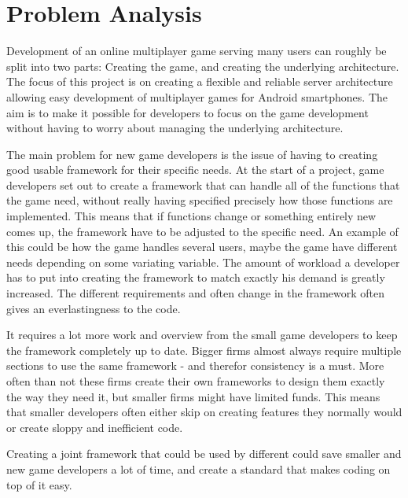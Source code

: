 \chapter{Problem Analysis}


Development of an online multiplayer game serving many users can roughly be split into two parts: Creating the game, and creating the underlying architecture. The focus of this project is on creating a flexible and reliable server architecture  allowing easy development of multiplayer games for Android smartphones. The aim is to make it possible for developers to focus on the game development without having to worry about managing the underlying architecture. 

The main problem for new game developers is the issue of having to creating  good usable framework for their specific needs. At the start of a project, game developers set out to create a framework that can handle all of the functions that the game need, without really having specified precisely how those functions are implemented. This means that if functions change or something entirely new comes up, the framework have to be adjusted to the specific need. An example of this could be how the game handles several users, maybe the game have different needs depending on some variating variable. The amount of workload a developer has to put into creating the framework to match exactly his demand is greatly increased. The different requirements and often change in the framework often gives an everlastingness to the code.

It requires a lot more work and overview from the small game developers to keep the framework completely up to date. Bigger firms almost always require multiple sections to use the same framework - and therefor consistency is a must. More often than not these firms create their own frameworks to design them exactly the way they need it, but smaller firms might have limited funds. This means that smaller developers often either skip on creating features they normally would or create sloppy and inefficient code.

Creating a joint framework that could be used by different could save smaller and new game developers a lot of time, and create a standard that makes coding on top of it easy. 






